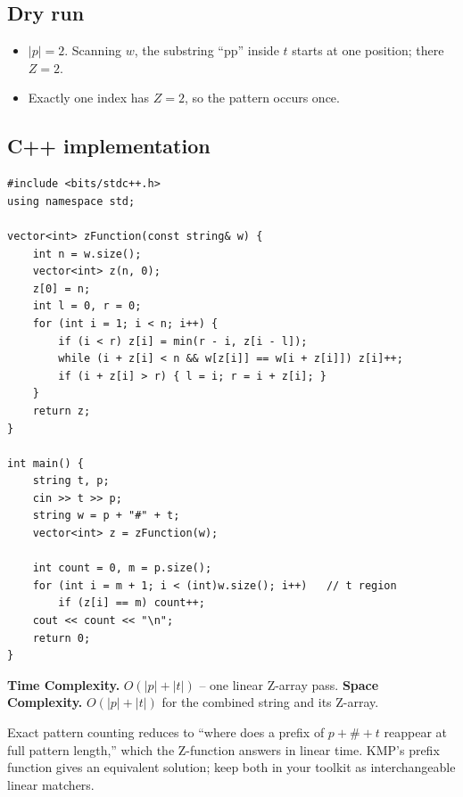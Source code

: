 \subsection*{Dry run}


\begin{itemize}
  \item $|p|=2$. Scanning $w$, the substring ``pp'' inside $t$ starts at
        one position; there $Z=2$.
  \item Exactly one index has $Z=2$, so the pattern occurs once.
\end{itemize}

\subsection*{C++ implementation}

\begin{lstlisting}
#include <bits/stdc++.h>
using namespace std;

vector<int> zFunction(const string& w) {
    int n = w.size();
    vector<int> z(n, 0);
    z[0] = n;
    int l = 0, r = 0;
    for (int i = 1; i < n; i++) {
        if (i < r) z[i] = min(r - i, z[i - l]);
        while (i + z[i] < n && w[z[i]] == w[i + z[i]]) z[i]++;
        if (i + z[i] > r) { l = i; r = i + z[i]; }
    }
    return z;
}

int main() {
    string t, p;
    cin >> t >> p;
    string w = p + "#" + t;
    vector<int> z = zFunction(w);

    int count = 0, m = p.size();
    for (int i = m + 1; i < (int)w.size(); i++)   // t region
        if (z[i] == m) count++;
    cout << count << "\n";
    return 0;
}
\end{lstlisting}

\begin{complexitybox}
\textbf{Time Complexity.} $O(|p|+|t|)$ -- one linear Z-array pass.
\textbf{Space Complexity.} $O(|p|+|t|)$ for the combined string and its
Z-array.
\end{complexitybox}

\begin{takeawaybox}
Exact pattern counting reduces to ``where does a prefix of $p+\#+t$
reappear at full pattern length,'' which the Z-function answers in linear
time. KMP's prefix function gives an equivalent solution; keep both in
your toolkit as interchangeable linear matchers.
\end{takeawaybox}
